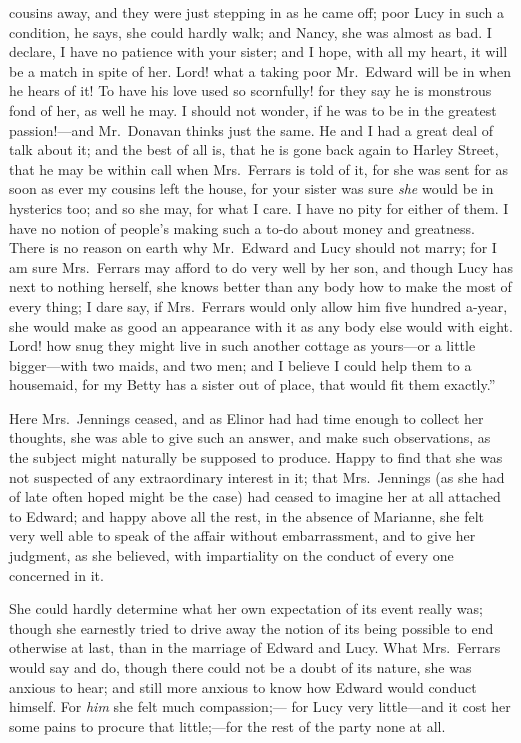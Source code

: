 \documentclass{article}
\begin{document}
cousins away, and they were just stepping in as he
came off; poor Lucy in such a condition, he says,
she could hardly walk; and Nancy, she was almost as bad.
I declare, I have no patience with your sister; and I hope,
with all my heart, it will be a match in spite of her.
Lord! what a taking poor Mr.\ Edward will be in when he
hears of it!  To have his love used so scornfully! for
they say he is monstrous fond of her, as well he may.
I should not wonder, if he was to be in the greatest
passion!---and Mr.\ Donavan thinks just the same.  He and I
had a great deal of talk about it; and the best of all is,
that he is gone back again to Harley Street, that he may
be within call when Mrs.\ Ferrars is told of it, for she
was sent for as soon as ever my cousins left the house,
for your sister was sure \emph{she} would be in hysterics too;
and so she may, for what I care.  I have no pity for
either of them.  I have no notion of people's making
such a to-do about money and greatness.  There is no
reason on earth why Mr.\ Edward and Lucy should not marry;
for I am sure Mrs.\ Ferrars may afford to do very well
by her son, and though Lucy has next to nothing herself,
she knows better than any body how to make the most
of every thing; I dare say, if Mrs.\ Ferrars would only
allow him five hundred a-year, she would make as good
an appearance with it as any body else would with eight.
Lord! how snug they might live in such another cottage
as yours---or a little bigger---with two maids, and two men;
and I believe I could help them to a housemaid, for my
Betty has a sister out of place, that would fit them
exactly.''

Here Mrs.\ Jennings ceased, and as Elinor had had
time enough to collect her thoughts, she was able
to give such an answer, and make such observations,
as the subject might naturally be supposed to produce.
Happy to find that she was not suspected of any extraordinary
interest in it; that Mrs.\ Jennings (as she had of late
often hoped might be the case) had ceased to imagine her
at all attached to Edward; and happy above all the rest,
in the absence of Marianne, she felt very well able
to speak of the affair without embarrassment, and to
give her judgment, as she believed, with impartiality
on the conduct of every one concerned in it.

She could hardly determine what her own expectation
of its event really was; though she earnestly tried
to drive away the notion of its being possible to end
otherwise at last, than in the marriage of Edward and Lucy.
What Mrs.\ Ferrars would say and do, though there could
not be a doubt of its nature, she was anxious to hear;
and still more anxious to know how Edward would
conduct himself.  For \emph{him} she felt much compassion;---%
for Lucy very little---and it cost her some pains to procure
that little;---for the rest of the party none at all.
\end{document}
